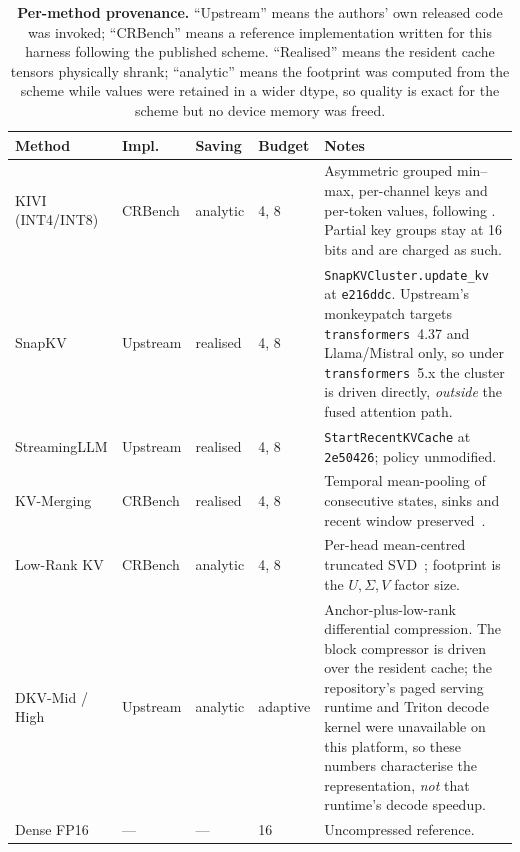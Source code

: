\documentclass{article}
\theoremstyle{definition}
\begin{document}
\begin{table}[t]
\centering
\small
\setlength{\tabcolsep}{3.6pt}
\caption{\textbf{Per-method provenance.} ``Upstream'' means the authors' own released code was invoked; ``CRBench'' means a reference implementation written for this harness following the published scheme. ``Realised'' means the resident cache tensors physically shrank; ``analytic'' means the footprint was computed from the scheme while values were retained in a wider dtype, so quality is exact for the scheme but no device memory was freed.}
\label{tab:provenance}
\begin{tabular}{@{}l l l l >{\raggedright\arraybackslash}p{7.1cm}@{}}
\toprule
\textbf{Method} & \textbf{Impl.} & \textbf{Saving} & \textbf{Budget} & \textbf{Notes} \\
\midrule
KIVI (INT4/INT8) & CRBench & analytic & 4, 8 & Asymmetric grouped min--max, per-channel keys and per-token values, following \citet{liu2024kivi}. Partial key groups stay at 16 bits and are charged as such. \\[2pt]
SnapKV & Upstream & realised & 4, 8 & \texttt{SnapKVCluster.update\_kv} at \texttt{e216ddc}. Upstream's monkeypatch targets \texttt{transformers}~4.37 and Llama/Mistral only, so under \texttt{transformers}~5.x the cluster is driven directly, \emph{outside} the fused attention path. \\[2pt]
StreamingLLM & Upstream & realised & 4, 8 & \texttt{StartRecentKVCache} at \texttt{2e50426}; policy unmodified. \\[2pt]
KV-Merging & CRBench & realised & 4, 8 & Temporal mean-pooling of consecutive states, sinks and recent window preserved~\citep{ge2023model}. \\[2pt]
Low-Rank KV & CRBench & analytic & 4, 8 & Per-head mean-centred truncated SVD~\citep{sharma2023truth}; footprint is the $U,\Sigma,V$ factor size. \\[2pt]
DKV-Mid / High & Upstream & analytic & adaptive & Anchor-plus-low-rank differential compression. The block compressor is driven over the resident cache; the repository's paged serving runtime and Triton decode kernel were unavailable on this platform, so these numbers characterise the representation, \emph{not} that runtime's decode speedup. \\[2pt]
Dense FP16 & --- & --- & 16 & Uncompressed reference. \\
\bottomrule
\end{tabular}
\end{table}
\end{document}
